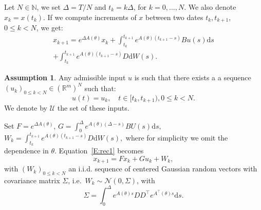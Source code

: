 \documentclass[twocolumn]{autart}
\theoremstyle{definition}
\newtheorem{assumption}[theorem]{Assumption}
\theoremstyle{remark}
\newcommand{\R}{\mathbb{R}}
\newcommand{\N}{\mathbb{N}}
\newcommand{\diff}{\mathrm{d}}
\newcommand{\U}{\mathcal{U}}
\begin{document}
Let $N\in \N$, we set $\Delta=T/N$ and $t_k=k \Delta$, for $k=0,\dots, N$. We also denote $x_k=x(t_k)$. If we compute increments of $x$ between two dates $t_{k},t_{k+1}$, $0\leq k<N$, we get:
\begin{multline}\label{E:rec1}
x_{k+1}=e^{\Delta A(\theta)}x_k+\int_{t_k}^{t_{k+1}}e^{A(\theta)(t_{k+1}-s)}Bu(s)\diff s
\\
+
\int_{t_k}^{t_{k+1}}e^{A(\theta)(t_{k+1}-s)}D \diff W(s).
\end{multline}
\begin{assumption}\label{A:periodic}
Any admissible input $u$ is such that there exists a %
a sequence $(u_k)_{0\leq k<N}\in \left(\R^m\right)^N$ such that: 
\begin{equation*}
    u(t)=u_k, \quad  t\in [t_k,t_{k+1}), 0\leq k< N.
\end{equation*}
We denote by $\U$ the set of these inputs. 
\end{assumption}
Set $F=e^{\Delta A(\theta)}$,
$
G=\int_{0}^{\Delta}e^{A(\theta)(\Delta-s)}BU(s)\diff s,$
$W_k=\int_{t_k}^{t_{k+1}}e^{A(\theta)(t_{k+1}-s)}D \diff W(s),$
%
where for simplicity we omit the dependence in $\theta$.
Equation~\eqref{E:rec1} becomes 
\begin{equation*}
x_{k+1}=F x_k + G u_k + W_k,
\end{equation*}
with $(W_k)_{0\leq k<N}$ an i.i.d. sequence of centered Gaussian random vectors with covariance matrix $\Sigma$, i.e.\ $W_k\sim \mathcal{N}(0,\Sigma)$, with
$$
\Sigma = \int_0^\Delta e^{A(\theta)s}D D^\top  e^{A^\top(\theta)s}\diff s.
$$
\end{document}
